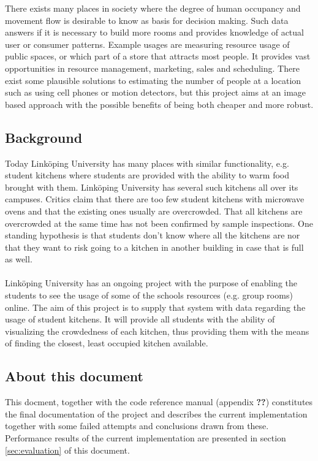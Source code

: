 There exists many places in society where the degree of human occupancy and movement flow is desirable to know as basis for decision making. Such data answers if it is necessary to build more rooms and provides knowledge of actual user or consumer patterns. Example usages are measuring resource usage of public spaces, or which part of a store that attracts most people. It provides vast opportunities in resource management, marketing, sales and scheduling. There exist some plausible solutions to estimating the number of people at a location such as using cell phones or motion detectors, but this project aims at an image based approach with the possible benefits of being both cheaper and more robust.

\subsection{Background}
Today Linköping University has many places with similar functionality, e.g. student kitchens where students are provided with the ability to warm food brought with them. Linköping University has several such kitchens all over its campuses. Critics claim that there are too few student kitchens with microwave ovens and that the existing ones usually are overcrowded. That all kitchens are overcrowded at the same time has not been confirmed by sample inspections. One standing hypothesis is that students don't know where all the kitchens are nor that they want to risk going to a kitchen in another building in case that is full as well.\\
\\
Linköping University has an ongoing project with the purpose of enabling the students to see the usage of some of the schools resources (e.g. group rooms) online. The aim of this project is to supply that system with data regarding the usage of student kitchens. It will provide all students with the ability of visualizing the crowdedness of each kitchen, thus providing them with the means of finding the closest, least occupied kitchen available.

\subsection{About this document}
This docment, together with the code reference manual (appendix \textbf{??}) constitutes the final documentation of the project and describes the current implementation together with some failed attempts and conclusions drawn from these. Performance results of the current implementation are presented in section \ref{sec:evaluation} of this document.
